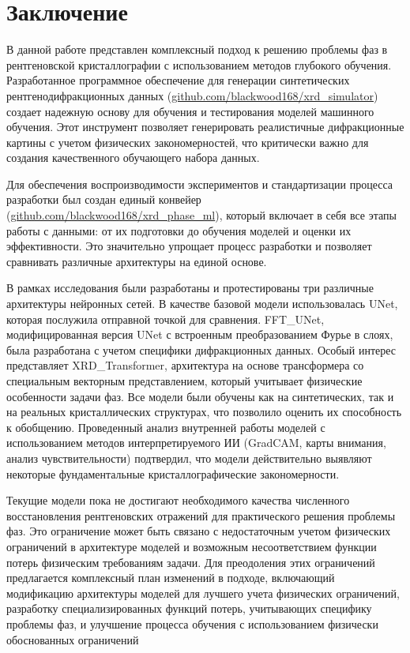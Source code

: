 \section{Заключение}

В данной работе представлен комплексный подход к решению проблемы фаз в рентгеновской кристаллографии с использованием методов глубокого обучения. Разработанное программное обеспечение для генерации синтетических рентгенодифракционных данных (\url{github.com/blackwood168/xrd_simulator}) создает надежную основу для обучения и тестирования моделей машинного обучения. Этот инструмент позволяет генерировать реалистичные дифракционные картины с учетом физических закономерностей, что критически важно для создания качественного обучающего набора данных.

Для обеспечения воспроизводимости экспериментов и стандартизации процесса разработки был создан единый конвейер (\url{github.com/blackwood168/xrd_phase_ml}), который включает в себя все этапы работы с данными: от их подготовки до обучения моделей и оценки их эффективности. Это значительно упрощает процесс разработки и позволяет сравнивать различные архитектуры на единой основе.

В рамках исследования были разработаны и протестированы три различные архитектуры нейронных сетей. В качестве базовой модели использовалась UNet, которая послужила отправной точкой для сравнения. FFT\_UNet, модифицированная версия UNet с встроенным преобразованием Фурье в слоях, была разработана с учетом специфики дифракционных данных. Особый интерес представляет XRD\_Transformer, архитектура на основе трансформера со специальным векторным представлением, который учитывает физические особенности задачи фаз. Все модели были обучены как на синтетических, так и на реальных кристаллических структурах, что позволило оценить их способность к обобщению.
Проведенный анализ внутренней работы моделей с использованием методов интерпретируемого ИИ (GradCAM, карты внимания, анализ чувствительности) подтвердил, что модели действительно выявляют некоторые фундаментальные кристаллографические закономерности. 

Текущие модели пока не достигают необходимого качества численного восстановления рентгеновских отражений для практического решения проблемы фаз. Это ограничение может быть связано с недостаточным учетом физических ограничений в архитектуре моделей и возможным несоответствием функции потерь физическим требованиям задачи. Для преодоления этих ограничений предлагается комплексный план изменений в подходе, включающий модификацию архитектуры моделей для лучшего учета физических ограничений, разработку специализированных функций потерь, учитывающих специфику проблемы фаз, и улучшение процесса обучения с использованием физически обоснованных ограничений

